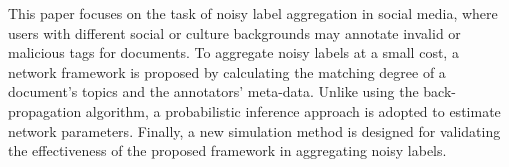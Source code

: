 This paper focuses on the task of noisy label aggregation in social media, where users with different social or culture backgrounds may annotate invalid or malicious tags for documents. To aggregate noisy labels at a small cost, a network framework is proposed by calculating the matching degree of a document's topics and the annotators' meta-data. Unlike using the back-propagation algorithm, a probabilistic inference approach is adopted to estimate network parameters. Finally, a new simulation method is designed for validating the effectiveness of the proposed framework in aggregating noisy labels.
